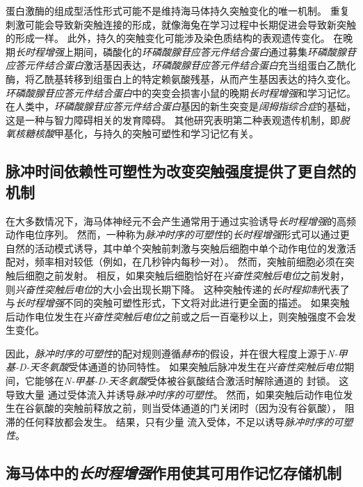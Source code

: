 蛋白激酶的组成型活性形式可能不是维持海马体持久突触变化的唯一机制。
重复刺激可能会导致新突触连接的形成，就像海兔在学习过程中长期促进会导致新突触的形成一样。
此外，持久的突触变化可能涉及染色质结构的表观遗传变化。
在晚期\textit{长时程增强}上期间，磷酸化的\textit{环磷酸腺苷应答元件结合蛋白}通过募集\textit{环磷酸腺苷应答元件结合蛋白}激活基因表达，\textit{环磷酸腺苷应答元件结合蛋白}充当组蛋白乙酰化酶，将乙酰基转移到组蛋白上的特定赖氨酸残基，从而产生基因表达的持久变化。
\textit{环磷酸腺苷应答元件结合蛋白}中的突变会损害小鼠的晚期\textit{长时程增强}和学习记忆。
在人类中，\textit{环磷酸腺苷应答元件结合蛋白}基因的新生突变是\textit{阔拇指综合症}的基础，这是一种与智力障碍相关的发育障碍。
其他研究表明第二种表观遗传机制，即\textit{脱氧核糖核酸}甲基化，与持久的突触可塑性和学习记忆有关。



\subsection{脉冲时间依赖性可塑性为改变突触强度提供了更自然的机制}

在大多数情况下，海马体神经元不会产生通常用于通过实验诱导\textit{长时程增强}的高频动作电位序列。
然而，一种称为\textit{脉冲时序的可塑性}的\textit{长时程增强}形式可以通过更自然的活动模式诱导，其中单个突触前刺激与突触后细胞中单个动作电位的发激活配对，频率相对较低（例如，在几秒钟内每秒一对）。
然而，突触前细胞必须在突触后细胞之前发射。
相反，如果突触后细胞恰好在\textit{兴奋性突触后电位}之前发射，则\textit{兴奋性突触后电位}的大小会出现长期下降。
这种突触传递的\textit{长时程抑制}代表了与\textit{长时程增强}不同的突触可塑性形式，下文将对此进行更全面的描述。
如果突触后动作电位发生在\textit{兴奋性突触后电位}之前或之后一百毫秒以上，则突触强度不会发生变化。


因此，\textit{脉冲时序的可塑性}的配对规则遵循\textit{赫布}的假设，并在很大程度上源于\textit{N-甲基-D-天冬氨酸}受体通道的协同特性。
如果突触后脉冲发生在\textit{兴奋性突触后电位}期间，它能够在\textit{N-甲基-D-天冬氨酸}受体被谷氨酸结合激活时解除通道的  封锁。
这导致大量  通过受体流入并诱导\textit{脉冲时序的可塑性}。
然而，如果突触后动作电位发生在谷氨酸的突触前释放之前，则当受体通道的门关闭时（因为没有谷氨酸）， 阻滞的任何释放都会发生。
结果，只有少量  流入受体，不足以诱导\textit{脉冲时序的可塑性}。



\subsection{海马体中的\textit{长时程增强}作用使其可用作记忆存储机制}

